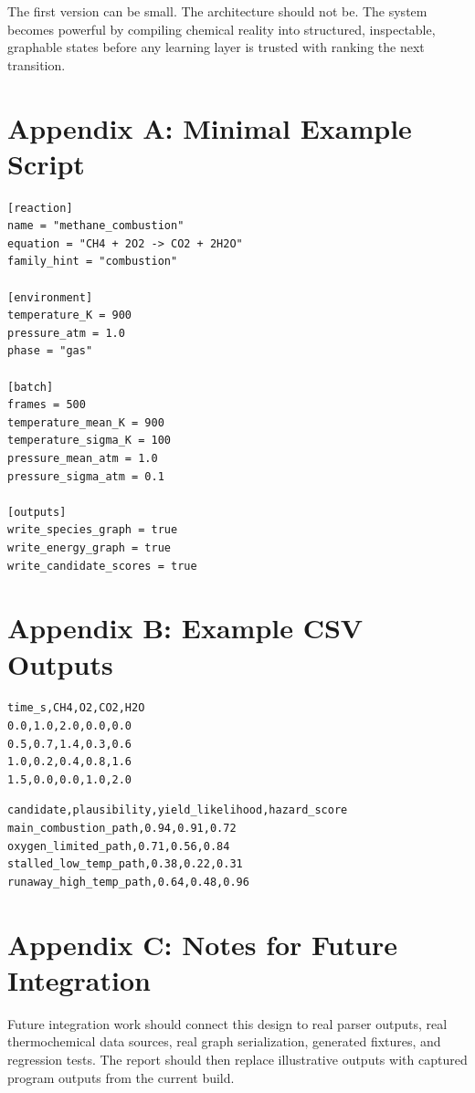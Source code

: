 \documentclass[11pt]{article}
\begin{document}
The first version can be small. The architecture should not be. The system becomes powerful by compiling chemical reality into structured, inspectable, graphable states before any learning layer is trusted with ranking the next transition.

\appendix

\section{Appendix A: Minimal Example Script}

\begin{lstlisting}[caption={Example input script for methane combustion}]
[reaction]
name = "methane_combustion"
equation = "CH4 + 2O2 -> CO2 + 2H2O"
family_hint = "combustion"

[environment]
temperature_K = 900
pressure_atm = 1.0
phase = "gas"

[batch]
frames = 500
temperature_mean_K = 900
temperature_sigma_K = 100
pressure_mean_atm = 1.0
pressure_sigma_atm = 0.1

[outputs]
write_species_graph = true
write_energy_graph = true
write_candidate_scores = true
\end{lstlisting}

\section{Appendix B: Example CSV Outputs}

\begin{lstlisting}[caption={Example species time series CSV}]
time_s,CH4,O2,CO2,H2O
0.0,1.0,2.0,0.0,0.0
0.5,0.7,1.4,0.3,0.6
1.0,0.2,0.4,0.8,1.6
1.5,0.0,0.0,1.0,2.0
\end{lstlisting}

\begin{lstlisting}[caption={Example candidate scores CSV}]
candidate,plausibility,yield_likelihood,hazard_score
main_combustion_path,0.94,0.91,0.72
oxygen_limited_path,0.71,0.56,0.84
stalled_low_temp_path,0.38,0.22,0.31
runaway_high_temp_path,0.64,0.48,0.96
\end{lstlisting}

\section{Appendix C: Notes for Future Integration}

Future integration work should connect this design to real parser outputs, real thermochemical data sources, real graph serialization, generated fixtures, and regression tests. The report should then replace illustrative outputs with captured program outputs from the current build.
\end{document}
